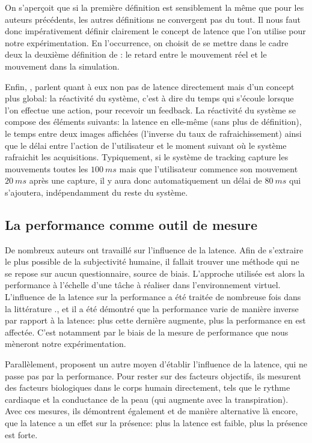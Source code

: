 	\par On s'aperçoit que si la première définition est sensiblement la même que pour les auteurs précédents, les autres définitions ne convergent pas du tout. Il nous faut donc impérativement définir clairement le concept de latence que l'on utilise pour notre expérimentation. En l'occurrence, on choisit de se mettre dans le cadre deux la deuxième définition de \citep{hale_handbook_2015}: le retard entre le mouvement réel et le mouvement dans la simulation.
	
	\par Enfin, \cite{watson_effects_1998}, parlent quant à eux non pas de latence directement mais d'un concept plus global: la réactivité du système, c'est à dire du temps qui s'écoule lorsque l'on effectue une action, pour recevoir un feedback. La réactivité du système se compose des éléments suivants: la latence en elle-même (sans plus de définition), le temps entre deux images affichées (l'inverse du taux de rafraichissement) ainsi que le délai entre l'action de l'utilisateur et le moment suivant où le système rafraichit les acquisitions. Typiquement, si le système de tracking capture les mouvements toutes les $100~ms$ mais que l'utilisateur commence son mouvement $20~ms$ après une capture, il y aura donc automatiquement un délai de $80~ms$ qui s'ajoutera, indépendamment du reste du système.
	
	\subsection{La performance comme outil de mesure}
	\par De nombreux auteurs ont travaillé sur l'influence de la latence. Afin de s'extraire le plus possible de la subjectivité humaine, il fallait trouver une méthode qui ne se repose sur aucun questionnaire, source de biais. L'approche utilisée est alors la performance à l'échelle d'une tâche à réaliser dans l'environnement virtuel. L'influence de la latence sur la performance a été traitée de nombreuse fois dans la littérature \citep{ellis_sensor_1999,mania_perceptual_2004,watson_effects_1998,papadakis_system_2011,meehan_effect_2003}., et il a été démontré que la performance varie de manière inverse par rapport à la latence: plus cette dernière augmente, plus la performance en est affectée. C'est notamment par le biais de la mesure de performance que nous mèneront notre expérimentation.
	
	\par Parallèlement, \citep{meehan_effect_2003} proposent un autre moyen d'établir l'influence de la latence, qui ne passe pas par la performance. Pour rester sur des facteurs objectifs, ils mesurent des facteurs biologiques dans le corps humain directement, tels que le rythme cardiaque et la conductance de la peau (qui augmente avec la transpiration). Avec ces mesures, ils démontrent également et de manière alternative là encore, que la latence a un effet sur la présence: plus la latence est faible, plus la présence est forte.
	
